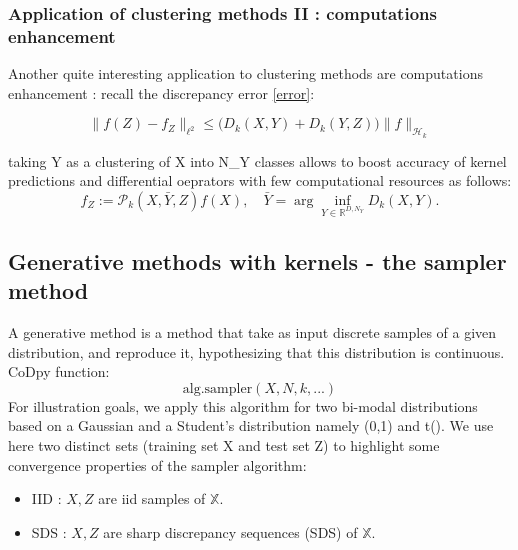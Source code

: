 \documentclass[
]{article}
\def\({}%
\def\){}%
\numberwithin{equation}{section}
\newcommand \RR    {\mathbb{R}}
\begin{document}
\hypertarget{application-of-clustering-methods-ii-computations-enhancement}{%
\subsubsection{Application of clustering methods II : computations
enhancement}\label{application-of-clustering-methods-ii-computations-enhancement}}

Another quite interesting application to clustering methods are
computations enhancement : recall the discrepancy error \eqref{error}:

\begin{equation}
\| f(Z) - f_Z \|_{\ell^2} \le ( D_k(X,Y) +D_k(Y,Z) \Big) \| f \|_{\mathcal{H}_k}
\end{equation}

\(\mapsto\) taking \(Y\) as a clustering of \(X\) into \(N_Y\) classes
allows to boost accuracy of kernel predictions and differential
oeprators with few computational resources as follows: \begin{equation} 
f_Z := \mathcal{P}_{k}(X,\bar{Y},Z)f(X), \quad \bar{Y} = \arg \inf_{Y \in \RR^{D,N_Y}} D_k(X,Y).
\end{equation}

\newpage

\hypertarget{generative-methods-with-kernels---the-sampler-method}{%
\subsection{Generative methods with kernels - the sampler
method}\label{generative-methods-with-kernels---the-sampler-method}}

A generative method is a method that take as input discrete samples of a
given distribution, and reproduce it, hypothesizing that this
distribution is continuous. CoDpy function: \[
\text{alg.sampler}(X,N,k,...)
\] For illustration goals, we apply this algorithm for two bi-modal
distributions based on a Gaussian and a Student's distribution namely
\((0,1)\) and \(t()\). We use here two distinct sets
(training set \(X\) and test set \(Z\)) to highlight some convergence
properties of the sampler algorithm:

\begin{itemize}\setlength{\itemsep}{0pt}
    \item IID : $X,Z$ are iid samples of $\mathbb{X}$.
    \item SDS : $X,Z$ are sharp discrepancy sequences (SDS) of $\mathbb{X}$.
\end{itemize}
\end{document}
